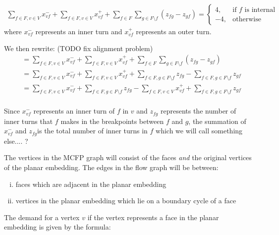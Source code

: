 \documentclass[12pt]{article}
\begin{document}
\begin{align*}
  \sum_{f \in F, v \in V}{x_{vf}^{-}} + \sum_{f \in F, v \in V}{x_{vf}^{+}} + \sum_{f \in F}\sum_{g \in F \setminus f}(z_{fg} - z_{gf}) = \begin{cases}
                                                                                       4, & \text{if } f \text{ is internal}\\
                                                                                      -4, & \text{otherwise}
                                                                                   \end{cases}
\end{align*}
where $x_{vf}^{-}$ represents an inner turn and $x_{vf}^{+}$ represents an outer turn.

We then rewrite: (TODO fix alignment problem)
\begin{align*}
  &= \sum_{f \in F, v \in V}{x_{vf}^{-}} + \sum_{f \in F, v \in V}{x_{vf}^{+}} + \sum_{f \in F}\sum_{g \in F \setminus f}(z_{fg} - z_{gf})\\
  &= \sum_{f \in F, v \in V}{x_{vf}^{-}} + \sum_{f \in F, v \in V}{x_{vf}^{+}} + \sum_{f \in F, g \in F\setminus f}{z_{fg}} - \sum_{f \in F, g \in F \setminus f}z_{gf}\\
  &= \sum_{f \in F, v \in V}{x_{vf}^{-}} + \sum_{f \in F, g \in F\setminus f}{z_{fg}} - \sum_{f \in F, v \in V}{x_{vf}^{+}} + \sum_{f \in F, g \in F \setminus f}z_{gf}\\
\end{align*}

Since $x_{vf}^{-}$ represents an inner turn of $f$ in $v$ and $z_{fg}$ represents the number of inner turns that $f$ makes in the breakpoints between $f$ and $g$, the summation of $x_{vf}^{-}$ and $z_{fg} $is the total number of inner turns in $f$ which we will call something else.... ?

The vertices in the MCFP graph will consist of the faces \textit{and} the original vertices of the planar embedding. The edges in the flow graph will be between:

\begin{enumerate}[(i)]
  \item faces which are adjacent in the planar embedding
  \item vertices in the planar embedding which lie on a boundary cycle of a face
\end{enumerate}

The demand for a vertex $v$ if the vertex represents a face in the planar embedding is given by the formula:
\end{document}
